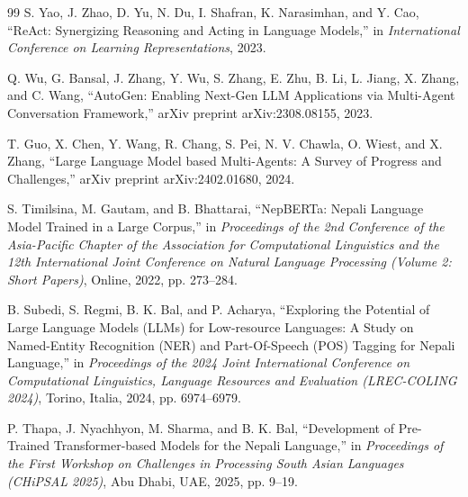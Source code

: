 \documentclass[12pt,a4paper]{report}
\begin{document}
\begin{thebibliography}{99}
S. Yao, J. Zhao, D. Yu, N. Du, I. Shafran, K. Narasimhan, and Y. Cao, ``ReAct: Synergizing Reasoning and Acting in Language Models,'' in \emph{International Conference on Learning Representations}, 2023.

Q. Wu, G. Bansal, J. Zhang, Y. Wu, S. Zhang, E. Zhu, B. Li, L. Jiang, X. Zhang, and C. Wang, ``AutoGen: Enabling Next-Gen LLM Applications via Multi-Agent Conversation Framework,'' arXiv preprint arXiv:2308.08155, 2023.

T. Guo, X. Chen, Y. Wang, R. Chang, S. Pei, N. V. Chawla, O. Wiest, and X. Zhang, ``Large Language Model based Multi-Agents: A Survey of Progress and Challenges,'' arXiv preprint arXiv:2402.01680, 2024.

S. Timilsina, M. Gautam, and B. Bhattarai, ``NepBERTa: Nepali Language Model Trained in a Large Corpus,'' in \emph{Proceedings of the 2nd Conference of the Asia-Pacific Chapter of the Association for Computational Linguistics and the 12th International Joint Conference on Natural Language Processing (Volume 2: Short Papers)}, Online, 2022, pp. 273--284.

B. Subedi, S. Regmi, B. K. Bal, and P. Acharya, ``Exploring the Potential of Large Language Models (LLMs) for Low-resource Languages: A Study on Named-Entity Recognition (NER) and Part-Of-Speech (POS) Tagging for Nepali Language,'' in \emph{Proceedings of the 2024 Joint International Conference on Computational Linguistics, Language Resources and Evaluation (LREC-COLING 2024)}, Torino, Italia, 2024, pp. 6974--6979.

P. Thapa, J. Nyachhyon, M. Sharma, and B. K. Bal, ``Development of Pre-Trained Transformer-based Models for the Nepali Language,'' in \emph{Proceedings of the First Workshop on Challenges in Processing South Asian Languages (CHiPSAL 2025)}, Abu Dhabi, UAE, 2025, pp. 9--19.

\end{thebibliography}
\endgroup
\end{document}
